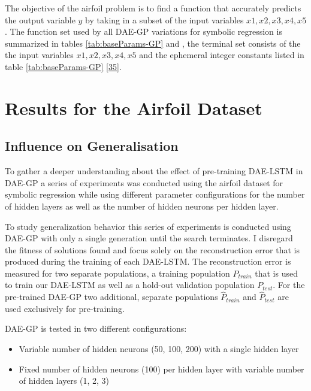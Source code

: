 \documentclass[
  11pt,
]{article}
\providecommand{\tightlist}{%
  \setlength{\itemsep}{0pt}\setlength{\parskip}{0pt}}
\begin{document}
The objective of the airfoil problem is to find a function that accurately predicts the output variable \(y\) by taking in a subset of the input variables \(x1,x2,x3,x4,x5\).
The function set used by all DAE-GP variations for symbolic regression is summarized in tables \ref{tab:baseParams-GP} and , the terminal set consists of the the input variables \(x1,x2,x3,x4,x5\) and the ephemeral integer constants listed in table \ref{tab:baseParams-GP} {[}\protect\hyperlink{ref-dae-gp_2022_symreg}{35}{]}.

\hypertarget{results-for-the-airfoil-dataset}{%
\section{Results for the Airfoil Dataset}\label{results-for-the-airfoil-dataset}}

\hypertarget{influence-on-generalisation}{%
\subsection{Influence on Generalisation}\label{influence-on-generalisation}}

To gather a deeper understanding about the effect of pre-training DAE-LSTM in DAE-GP a series of experiments was conducted using the airfoil dataset for symbolic regression while using different parameter configurations for the number of hidden layers as well as the number of hidden neurons per hidden layer.

To study generalization behavior this series of experiments is conducted using DAE-GP with only a single generation until the search terminates.
I disregard the fitness of solutions found and focus solely on the reconstruction error that is produced during the training of each DAE-LSTM.
The reconstruction error is measured for two separate populations, a training population \(P_{train}\) that is used to train our DAE-LSTM as well as a hold-out validation population \(P_{test}\).
For the pre-trained DAE-GP two additional, separate populations \(\hat{P}_{train}\) and \(\hat{P}_{test}\) are used exclusively for pre-training.

DAE-GP is tested in two different configurations:

\begin{itemize}
\tightlist
\item
  Variable number of hidden neurons (50, 100, 200) with a single hidden layer
\item
  Fixed number of hidden neurons (100) per hidden layer with variable number of hidden layers (1, 2, 3)
\end{itemize}
\end{document}
